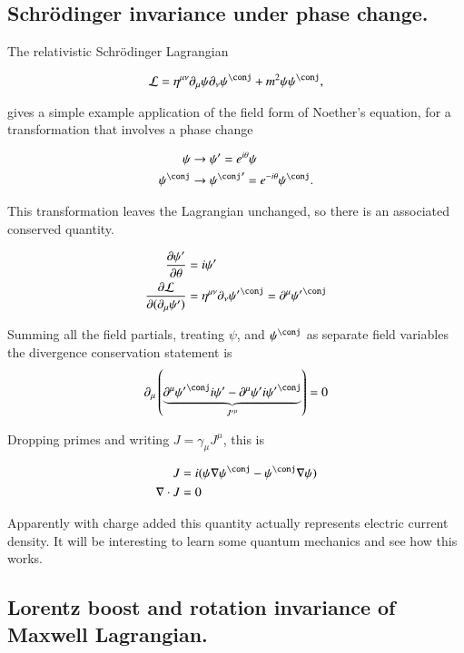 \documentclass{article}
\begin{document}
\subsection{ Schr\"{o}dinger invariance under phase change. }

The relativistic Schr\"{o}dinger Lagrangian

\begin{align*}
\LL = \eta^{\mu\nu}\partial_\mu \psi \partial_\nu \psi^\conj + m^2 \psi \psi^\conj,
\end{align*}

gives a simple example application of the field form of Noether's equation, for a 
transformation that involves a phase change

\begin{align*}
\psi &\rightarrow \psi' = e^{i\theta}\psi \\
\psi^\conj &\rightarrow {\psi^\conj}' = e^{-i\theta}\psi^\conj.
\end{align*}

This transformation leaves the Lagrangian unchanged, so there is an associated conserved
quantity.

\begin{align*}
\PD{\theta}{\psi'} &= i \psi' \\
\PD{(\partial_\mu \psi')}{\LL} &= \eta^{\mu\nu}\partial_\nu {\psi'}^\conj = \partial^\mu {\psi'}^\conj 
\end{align*}

Summing all the field partials, treating $\psi$, and $\psi^\conj$ as separate
field variables the divergence conservation statement is
\begin{align*}
\partial_\mu \left(
\underbrace{
\partial^\mu {\psi'}^\conj i\psi'
-\partial^\mu {\psi'} i{\psi'}^\conj
}_{{J'}^\mu}
\right) = 0
\end{align*}

Dropping primes and writing $J = \gamma_\mu J^\mu$, this is

\begin{align*}
J &= i (\psi \grad {\psi}^\conj - \psi^\conj \grad {\psi} ) \\
\grad \cdot J &= 0
\end{align*}

Apparently with charge added this quantity actually represents electric current density.  It will be interesting to
learn some quantum mechanics and see how this works.

\subsection{ Lorentz boost and rotation invariance of Maxwell Lagrangian. }
\end{document}
